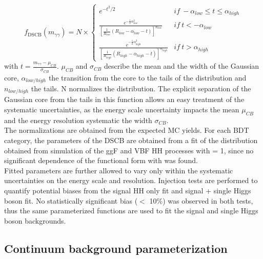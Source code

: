 \begin{equation}
    f_{\mathrm{DSCB}}\left(m_{\gamma \gamma}\right)=N \times\left\{\begin{array}{ll}
e^{-t^{2} / 2} &  if \ -\alpha_{low } \leq t \leq \alpha_{high } \\

\frac{e^{-\frac{1}{2} \alpha_{low }^{2}}} {  \left[  \frac{1}{ R_{low} } \left(R_{low }-\alpha_{low }-t\right) \right]^{n_{low }}} & if \ t<-\alpha_{low } \\

\frac{e^{-\frac{1}{2} \alpha_{high }^{2}}} {  \left[  \frac{1}{ R_{high} } \left(R_{high }-\alpha_{high }-t\right) \right]^{n_{high }}} &  if \ t>\alpha_{high }
\end{array}\right.
\end{equation}
with $t = \frac{m_{\gamma\gamma} - \mu_{CB}}{\sigma_{CB}}$. $\mu_{CB}$ and $\sigma_{CB}$ describe the mean and the width of the Gaussian core, $\alpha_{low/high}$ the transition from the core to the tails of the distribution and $n_{low/high}$ the tails. N normalizes the distribution. The explicit separation of the Gaussian core from the tails in this function allows an easy treatment of the systematic uncertainties, as the energy scale uncertainty impacts the mean $\mu_{CB}$ and the energy resolution systematic the width $\sigma_{CB}$.\\
The normalizations are obtained from the expected MC yields. For each BDT category, the parameters of the DSCB are obtained from a fit of the \myy distribution obtained from simulation of the ggF and VBF HH processes with \kl = 1, since no significant dependence of the functional form with \kl was found. \\
Fitted parameters are further allowed to vary only within the systematic uncertainties on the energy scale and resolution. Injection tests are performed to quantify potential biases from the signal HH only fit and signal + single Higgs boson fit. No statistically significant bias ($<$ 10\%) was observed in both tests, thus the same parameterized functions are used to fit the signal and single Higgs boson backgrounds.    

\subsection{Continuum background parameterization}
\label{HHyybb:Modelling:Bkg}

